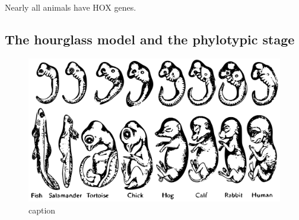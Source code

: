 Nearly all animals have HOX genes.
  



\subsection{The hourglass model and the phylotypic stage}




\begin{figure}[H]
    \includegraphics[width=\linewidth]{ch.introduction/imgs/haeckel.png}
    \caption{caption}
    \label{fig:haeckel}
\end{figure}

